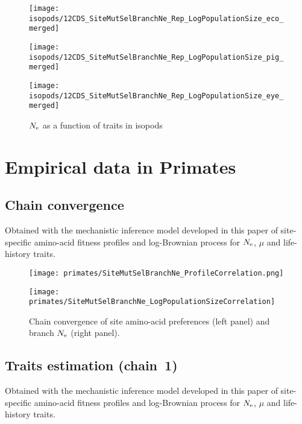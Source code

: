 \begin{figure}[H]
    \centering
    \begin{minipage}{0.32\linewidth}
        \texttt{[image: isopods/12CDS\_SiteMutSelBranchNe\_Rep\_LogPopulationSize\_eco\_merged]}
    \end{minipage} \hfill
    \begin{minipage}{0.32\linewidth}
        \texttt{[image: isopods/12CDS\_SiteMutSelBranchNe\_Rep\_LogPopulationSize\_pig\_merged]}
    \end{minipage} \hfill
    \begin{minipage}{0.32\linewidth}
        \texttt{[image: isopods/12CDS\_SiteMutSelBranchNe\_Rep\_LogPopulationSize\_eye\_merged]}
    \end{minipage}
    \caption[$\Ne$ as a function of traits in isopods]{$\Ne$ as a function of traits in isopods}
\end{figure}


\section{Empirical data in Primates}
\label{sec:empirical-data-in-primates}

\subsection{Chain convergence}
Obtained with the mechanistic inference model developed in this paper of site-specific amino-acid fitness profiles and log-Brownian process for $\Ne$, $\mu$ and life-history traits.

\begin{figure}[H]
    \centering
    \begin{minipage}{0.49\linewidth}
        \texttt{[image: primates/SiteMutSelBranchNe\_ProfileCorrelation.png]}
    \end{minipage} \hfill
    \begin{minipage}{0.49\linewidth}
        \texttt{[image: primates/SiteMutSelBranchNe\_LogPopulationSizeCorrelation]}
    \end{minipage}
    \caption[Chain convergence of site profiles and branche $\Ne$]{
    Chain convergence of site amino-acid preferences (left panel) and branch $\Ne$ (right panel).}
\end{figure}

\subsection{Traits estimation (chain~1)}
Obtained with the mechanistic inference model developed in this paper of site-specific amino-acid fitness profiles and log-Brownian process for $\Ne$, $\mu$ and life-history traits.

